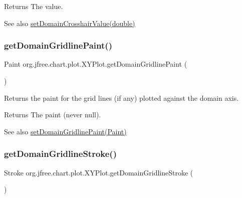 \begin{DoxyReturn}{Returns}
The value.
\end{DoxyReturn}
\begin{DoxySeeAlso}{See also}
\mbox{\hyperlink{classorg_1_1jfree_1_1chart_1_1plot_1_1_x_y_plot_a00691ca44150f95ff515fb987e734585}{set\+Domain\+Crosshair\+Value(double)}} 
\end{DoxySeeAlso}
\mbox{\label{classorg_1_1jfree_1_1chart_1_1plot_1_1_x_y_plot_a95c888de7e6e6a42ea77151a3d993b2a}} 
\subsubsection{\texorpdfstring{get\+Domain\+Gridline\+Paint()}{getDomainGridlinePaint()}}
{\footnotesize\ttfamily Paint org.\+jfree.\+chart.\+plot.\+X\+Y\+Plot.\+get\+Domain\+Gridline\+Paint (\begin{DoxyParamCaption}{ }\end{DoxyParamCaption})}

Returns the paint for the grid lines (if any) plotted against the domain axis.

\begin{DoxyReturn}{Returns}
The paint (never {\ttfamily null}).
\end{DoxyReturn}
\begin{DoxySeeAlso}{See also}
\mbox{\hyperlink{classorg_1_1jfree_1_1chart_1_1plot_1_1_x_y_plot_a1b2e660d873040b9cdc3d29a79d03e7a}{set\+Domain\+Gridline\+Paint(\+Paint)}} 
\end{DoxySeeAlso}
\mbox{\label{classorg_1_1jfree_1_1chart_1_1plot_1_1_x_y_plot_a6aebe0dc593b268b8f16e8ca68795eae}} 
\subsubsection{\texorpdfstring{get\+Domain\+Gridline\+Stroke()}{getDomainGridlineStroke()}}
{\footnotesize\ttfamily Stroke org.\+jfree.\+chart.\+plot.\+X\+Y\+Plot.\+get\+Domain\+Gridline\+Stroke (\begin{DoxyParamCaption}{ }\end{DoxyParamCaption})}

